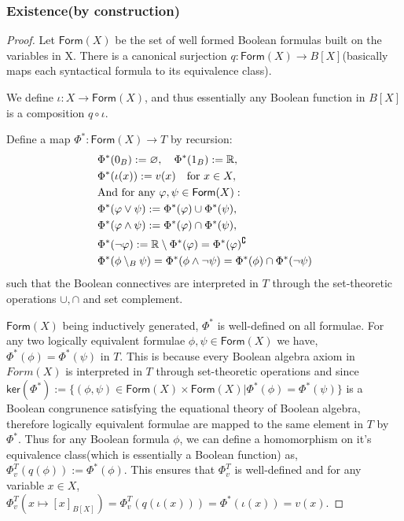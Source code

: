 \subsubsection*{Existence(by construction)}
\begin{proof}
Let $\mathsf{Form}(X)$ be the set of well formed Boolean formulas built on the variables in X. There is a canonical surjection 
$q:\mathsf{Form}(X)\rightarrow B[X]$(basically maps each syntactical formula to its equivalence class).

We define $\iota: X \rightarrow \mathsf{Form}(X)$, and thus essentially any Boolean function in $B[X]$ is a composition $q\circ \iota$.

Define a map $\Phi^*:\mathsf{Form}(X)\rightarrow T$ by recursion:
\begin{align*}
&\Phi^*(0_B) := \varnothing,\quad\Phi^*(1_B) := \mathbb{R},\\
&\Phi^*(\iota(x)) := v(x)\quad\text{for }x\in X,\\
\vspace{2cm}
&\text{And for any }\varphi,\psi \in \mathsf{Form}(X):\\
&\Phi^*(\varphi\vee\psi) := \Phi^*(\varphi)\cup\Phi^*(\psi),\\
&\Phi^*(\varphi\wedge\psi) := \Phi^*(\varphi)\cap\Phi^*(\psi),\\
&\Phi^*(\neg\varphi) := \mathbb{R}\setminus\Phi^*(\varphi)= \Phi^*(\varphi)^\complement\\
&\Phi^*(\phi \setminus_B \psi) = \Phi^*(\phi \wedge \neg \psi) = \Phi^*(\phi)\cap \Phi^*(\neg \psi)
\end{align*}
such that the Boolean connectives are interpreted in $T$ through the set-theoretic operations $\cup, \cap$ and set complement.

$\mathsf{Form}(X)$ being inductively generated, $\Phi^*$ is well-defined on all formulae.
  For any two logically equivalent formulae $\phi, \psi \in \mathsf{Form}(X)$ we have, $\Phi^*(\phi)=\Phi^*(\psi)$ in $T$. This is because every Boolean algebra axiom in $Form(X)$  is interpreted in $T$ through set-theoretic operations and since
  $\mathsf{ker}(\Phi^*):=\{(\phi,\psi)\in \mathsf{Form}(X)\times \mathsf{Form}(X)|\Phi^*(\phi)=\Phi^*(\psi)\}$ is a Boolean congrunence satisfying the equational theory of Boolean algebra, 
  therefore logically equivalent formulae are mapped to the same element in $T$ by $\Phi^*$.
  Thus for any Boolean formula $\phi$, we can define a homomorphism on it's equivalence class(which is essentially a Boolean function) as,  $\Phi_v^T(q(\phi)):=\Phi^*(\phi)$. This ensures that $\Phi_v^T$ is well-defined and for 
  any variable $x \in X$, $\Phi_v^T(x\mapsto [x]_{B[X]})=\Phi_v^T(q(\iota(x)))=\Phi^*(\iota(x))=v(x)$.

\end{proof}

